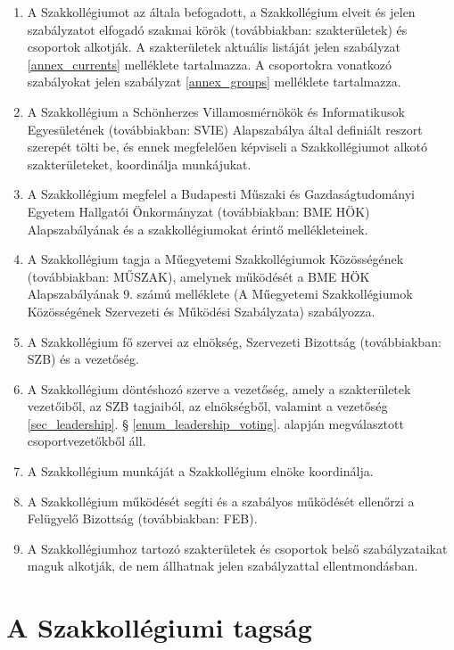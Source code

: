 \documentclass[12pt]{report}
\begin{document}
\begin{enumerate}
  \item A Szakkollégiumot az általa befogadott, a Szakkollégium elveit és jelen szabályzatot elfogadó szakmai körök (továbbiakban: szakterületek) és 
    csoportok alkotják. A szakterületek aktuális listáját jelen szabályzat \ref{annex_currents} melléklete tartalmazza. A csoportokra vonatkozó szabályokat jelen 
    szabályzat \ref{annex_groups} melléklete tartalmazza.
  \item A Szakkollégium a Schönherzes Villamosmérnökök és Informatikusok Egyesületének (továbbiakban: SVIE) Alapszabálya által definiált reszort szerepét 
    tölti be, és ennek megfelelően képviseli a Szakkollégiumot alkotó szakterületeket, koordinálja munkájukat.
  \item A Szakkollégium megfelel a Budapesti Műszaki és Gazdaságtudományi Egyetem Hallgatói Önkormányzat (továbbiakban: BME HÖK) Alapszabályának és a 
    szakkollégiumokat érintő mellékleteinek.
  \item A Szakkollégium tagja a Műegyetemi Szakkollégiumok Közösségének (továbbiakban: MŰSZAK), amelynek működését a BME HÖK Alapszabályának 9. számú 
    melléklete (A Műegyetemi Szakkollégiumok Közösségének Szervezeti és Működési Szabályzata) szabályozza. 
  \item A Szakkollégium fő szervei az elnökség, Szervezeti Bizottság (továbbiakban: SZB) és a vezetőség.
  \item A Szakkollégium döntéshozó szerve a vezetőség, amely a szakterületek vezetőiből, az SZB tagjaiból, az elnökségből, valamint a vezetőség 
    \ref{sec_leadership}. § \ref{enum_leadership_voting}. alapján megválasztott csoportvezetőkből áll.
  \item A Szakkollégium munkáját a Szakkollégium elnöke koordinálja.
  \item A Szakkollégium működését segíti és a szabályos működését ellenőrzi a Felügyelő Bizottság (továbbiakban: FEB).
  \item A Szakkollégiumhoz tartozó szakterületek és csoportok belső szabályzataikat maguk alkotják, de nem állhatnak jelen szabályzattal ellentmondásban.
\end{enumerate}


\section{A Szakkollégiumi tagság} \label{sec_membership}
\end{document}
